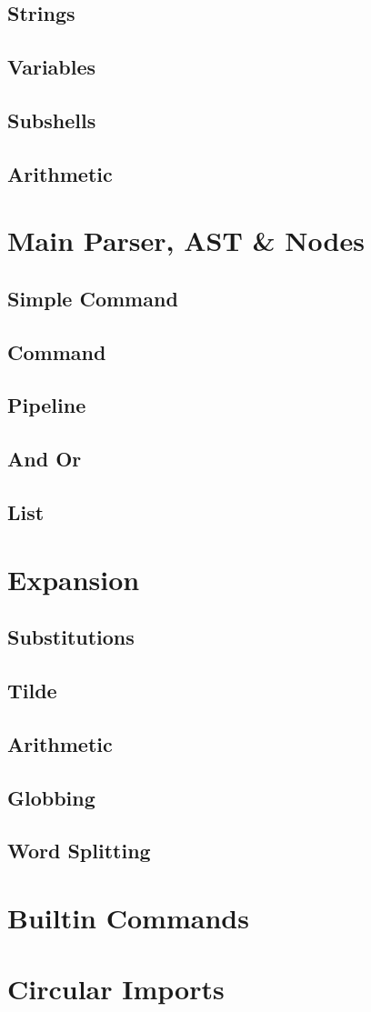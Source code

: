 \subsection{Strings}
\subsection{Variables}
\subsection{Subshells}
\subsection{Arithmetic}

\section{Main Parser, AST \& Nodes}

\subsection{Simple Command}
\subsection{Command}
\subsection{Pipeline}
\subsection{And Or}
\subsection{List}

\section{Expansion}

\subsection{Substitutions}
\subsection{Tilde}
\subsection{Arithmetic}
\subsection{Globbing}
\subsection{Word Splitting}

\section{Builtin Commands}

\section{Circular Imports}




